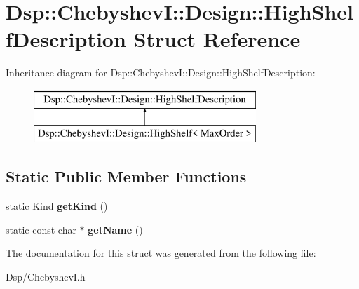 \hypertarget{structDsp_1_1ChebyshevI_1_1Design_1_1HighShelfDescription}{\section{Dsp\-:\-:Chebyshev\-I\-:\-:Design\-:\-:High\-Shelf\-Description Struct Reference}
\label{structDsp_1_1ChebyshevI_1_1Design_1_1HighShelfDescription}
}
Inheritance diagram for Dsp\-:\-:Chebyshev\-I\-:\-:Design\-:\-:High\-Shelf\-Description\-:\begin{figure}[H]
\begin{center}
\leavevmode
\includegraphics[height=2.000000cm]{structDsp_1_1ChebyshevI_1_1Design_1_1HighShelfDescription}
\end{center}
\end{figure}
\subsection*{Static Public Member Functions}
\begin{DoxyCompactItemize}
\item 
\hypertarget{structDsp_1_1ChebyshevI_1_1Design_1_1HighShelfDescription_a80ba329495c9f7c862ad00b26233a748}{static Kind {\bfseries get\-Kind} ()}\label{structDsp_1_1ChebyshevI_1_1Design_1_1HighShelfDescription_a80ba329495c9f7c862ad00b26233a748}

\item 
\hypertarget{structDsp_1_1ChebyshevI_1_1Design_1_1HighShelfDescription_a98ad6fd4593b7aae5c67a3aa7ac8b1d8}{static const char $\ast$ {\bfseries get\-Name} ()}\label{structDsp_1_1ChebyshevI_1_1Design_1_1HighShelfDescription_a98ad6fd4593b7aae5c67a3aa7ac8b1d8}

\end{DoxyCompactItemize}


The documentation for this struct was generated from the following file\-:\begin{DoxyCompactItemize}
\item 
Dsp/Chebyshev\-I.\-h\end{DoxyCompactItemize}
